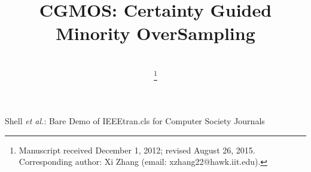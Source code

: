\documentclass[10pt,journal,compsoc]{IEEEtran}
\begin{document}
%
\title{CGMOS: Certainty Guided Minority OverSampling}

\author{\\
\thanks{Manuscript received December 1, 2012; revised August 26, 2015. 
Corresponding author: Xi Zhang (email: xzhang22@hawk.iit.edu).}}

%
{Shell \MakeLowercase{\textit{et al.}}: Bare Demo of IEEEtran.cls for Computer Society Journals}
% 
\end{document}
